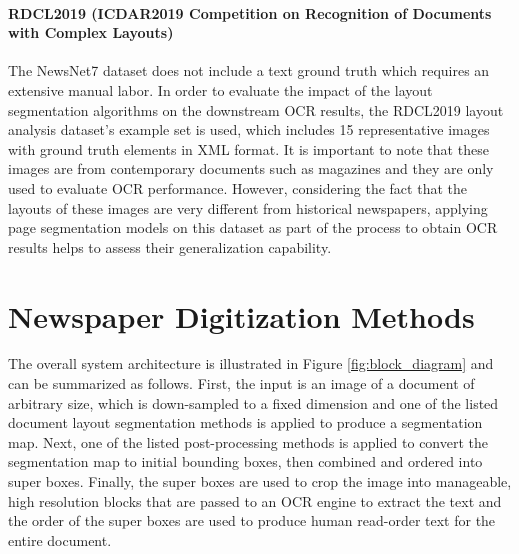 \documentclass[letterpaper]{article} %
\begin{document}
\paragraph{RDCL2019 (ICDAR2019 Competition on Recognition of Documents with Complex Layouts)}
The NewsNet7 dataset does not include a text ground truth which requires an extensive manual labor. In order to evaluate the impact of the layout segmentation algorithms on the downstream OCR results, the RDCL2019 layout analysis dataset's \cite{DBLP:conf/icdar/ClausnerAP19} example set  is used, which includes 15 representative images with ground truth elements in XML format. It is important to note that these images are from contemporary documents such as magazines and they are only used to evaluate OCR performance. However, considering the fact that the layouts of these images are very different from historical newspapers, applying page segmentation models on this dataset as part of the process to obtain OCR results helps to assess their generalization capability.    
 

 

\section{Newspaper Digitization Methods}
The overall system architecture is illustrated in Figure \ref{fig:block_diagram} and can be summarized as follows. First, the input is an image of a document of arbitrary size, which is down-sampled to a fixed dimension and one of the listed document layout segmentation methods is applied to produce a segmentation map. Next, one of the listed post-processing methods is applied to convert the segmentation map to initial bounding boxes, then combined and ordered into super boxes. Finally, the super boxes are used to crop the image into manageable, high resolution blocks that are passed to an OCR engine to extract the text and the order of the super boxes are used to produce human read-order text for the entire document.
\end{document}
